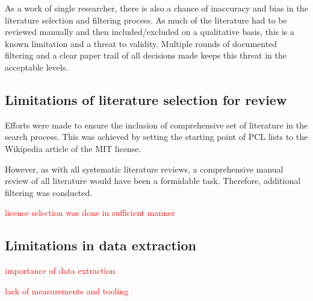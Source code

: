 As a work of single researcher, there is also a chance of inaccuracy and bias in the literature selection and filtering process. As much of the literature had to be reviewed manually and then included/excluded on a qualitative basis, this is a known limitation and a threat to validity. Multiple rounds of documented filtering and a clear paper trail of all decisions made keeps this threat in the acceptable levels.

\subsection{Limitations of literature selection for review}
Efforts were made to ensure the inclusion of comprehensive set of literature in the search process. This was achieved by setting the starting point of PCL lists to the Wikipedia article of the MIT license.

However, as with all systematic literature reviews, a comprehensive manual review of all literature would have been a formidable task. Therefore, additional filtering was conducted. 

\textcolor{red}{license selection was done in sufficient manner}


\subsection{Limitations in data extraction}

\textcolor{red}{importance of data extraction}

\textcolor{red}{lack of measurements and tooling}